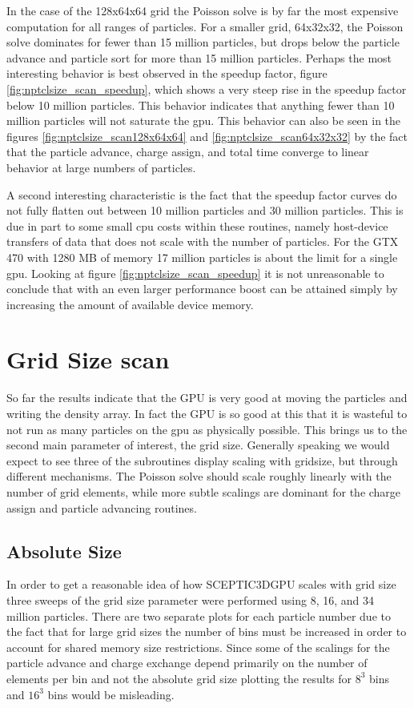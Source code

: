 In the case of the 128x64x64 grid the Poisson solve is by far the most expensive computation for all ranges of particles. For a smaller grid, 64x32x32, the Poisson solve dominates for fewer than 15 million particles, but drops below the particle advance and particle sort for more than 15 million particles. Perhaps the most interesting behavior is best observed in the speedup factor, figure \ref{fig:nptclsize_scan_speedup}, which shows a very steep rise in the speedup factor below 10 million particles. This behavior indicates that anything fewer than 10 million particles will not saturate the gpu. This behavior can also be seen in the figures \ref{fig:nptclsize_scan128x64x64} and \ref{fig:nptclsize_scan64x32x32} by the fact that the particle advance, charge assign, and total time converge to linear behavior at large numbers of particles. 

A second interesting characteristic is the fact that the speedup factor curves do not fully flatten out between 10 million particles and 30 million particles. This is due in part to some small cpu costs within these routines, namely host-device transfers of data that does not scale with the number of particles. For the GTX 470 with 1280 MB of memory 17 million particles is about the limit for a single gpu. Looking at figure \ref{fig:nptclsize_scan_speedup} it is not unreasonable to conclude that with an even larger performance boost can be attained simply by increasing the amount of available device memory.

	
\section{Grid Size scan}
So far the results indicate that the GPU is very good at moving the particles and writing the density array. In fact the GPU is so good at this that it is wasteful to not run as many particles on the gpu as physically possible. This brings us to the second main parameter of interest, the grid size. Generally speaking we would expect to see three of the subroutines display scaling with gridsize, but through different mechanisms. The Poisson solve should scale roughly linearly with the number of grid elements, while more subtle scalings are dominant for the charge assign and particle advancing routines. 

	\subsection{Absolute Size}
	In order to get a reasonable idea of how SCEPTIC3DGPU scales with grid size three sweeps of the grid size parameter were performed using 8, 16, and 34 million particles. There are two separate plots for each particle number due to the fact that for large grid sizes the number of bins must be increased in order to account for shared memory size restrictions. Since some of the scalings for the particle advance and charge exchange depend primarily on the number of elements per bin and not the absolute grid size plotting the results for $8^3$ bins and $16^3$ bins would be misleading.


